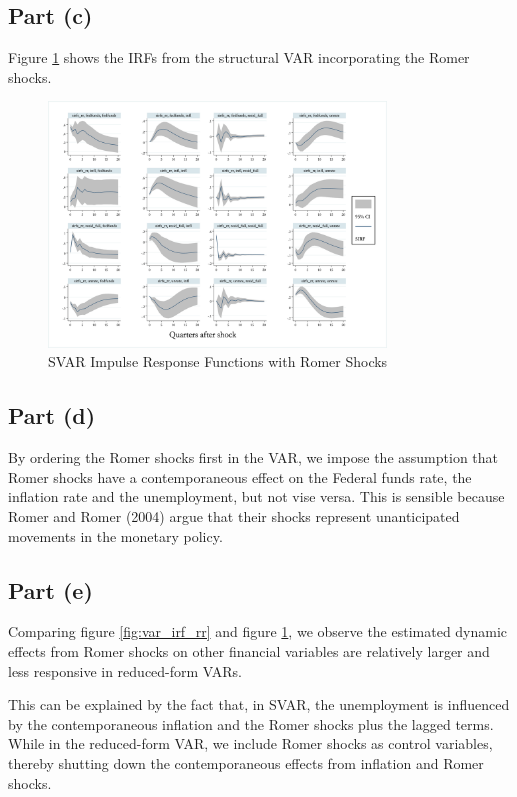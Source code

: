 \documentclass[12pt]{article}
\begin{document}
\subsection*{Part (c)} 

Figure \ref{fig:svar_irf_rr} shows the IRFs from the structural VAR incorporating the Romer shocks.

\begin{figure}[ht]
    \centering
    \includegraphics[width=0.8\textwidth]{figs/svar_irf_rr.png}
    \caption{SVAR Impulse Response Functions with Romer Shocks}
    \label{fig:svar_irf_rr}
\end{figure}

\subsection*{Part (d)} 

By ordering the Romer shocks first in the VAR, 
we impose the assumption that Romer shocks have a contemporaneous effect on the Federal funds rate, the inflation rate and the unemployment, but not vise versa. 
This is sensible because Romer and Romer (2004) argue that their shocks represent unanticipated movements in the monetary policy. 

\subsection*{Part (e)} 

Comparing figure \ref{fig:var_irf_rr} and figure \ref{fig:svar_irf_rr}, 
we observe the estimated dynamic effects from Romer shocks on other financial variables are relatively larger and less responsive in reduced-form VARs. 

This can be explained by the fact that, in SVAR, 
the unemployment is influenced by the contemporaneous inflation and the Romer shocks plus the lagged terms. 
While in the reduced-form VAR, we include Romer shocks as control variables,
thereby shutting down the contemporaneous effects from inflation and Romer shocks. 
\end{document}
